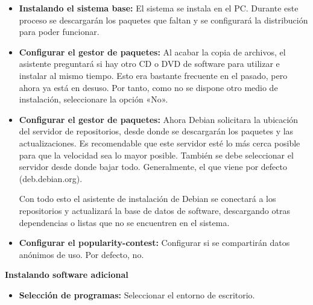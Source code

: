 				\begin{itemize}
					
					\item \textbf{Instalando el sistema base:} El sistema se instala en el PC. Durante este proceso se descargarán los paquetes que faltan y se configurará la distribución para poder funcionar.\par
					
					\item \textbf{Configurar el gestor de paquetes:} Al acabar la copia de archivos, el asistente preguntará si hay otro CD o DVD de software para utilizar e instalar al mismo tiempo. Esto era bastante frecuente en el pasado, pero ahora ya está en desuso. Por tanto, como no se dispone otro medio de instalación, seleccionare la opción «No».\par 
					
					\item \textbf{Configurar el gestor de paquetes:} Ahora Debian solicitara la ubicación del servidor de repositorios, desde donde se descargarán los paquetes y las actualizaciones. Es recomendable que este servidor esté lo más cerca posible para que la velocidad sea lo mayor posible. También se debe seleccionar el servidor desde donde bajar todo. Generalmente, el que viene por defecto (deb.debian.org).\par
					
					Con todo esto el asistente de instalación de Debian se conectará a los repositorios y actualizará la base de datos de software, descargando otras dependencias o listas que no se encuentren en el sistema.\par
					
					\item \textbf{Configurar el popularity-contest:} Configurar si se compartirán datos anónimos de uso. Por defecto, no.\par	
					
				\end{itemize}
				
				\clearpage
				
				\textbf{Instalando software adicional}\par\vspace{0.2cm}
				
				\begin{itemize}
					
					\item \textbf{Selección de programas:} Seleccionar el entorno de escritorio. \par
					
				\end{itemize}
				
